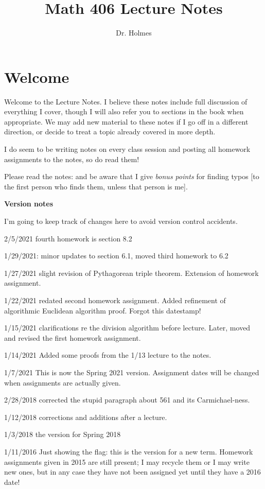 \documentclass[12pt]{article}
\title{Math 406 Lecture Notes}
\author{Dr. Holmes}
\date{2/5/2021:  fourth homework is section 8.2.

1/29/2021:  minor updates to section 6.1, moved third homework to 6.2\\
1/27/2021:  slight revision of Pythagorean triple theorem.  Extension of homework assignment.\\
1/22/2021:  redated second homework assigment (forgot to put this datestamp on)\\
1/15/2021:  clarifications before lecture;  (later) moved and revised the first homework assignment.\\
1/14/2021:  added some proofs given in the 1/13 lecture to the notes.\\
1/7/2021:  initial version of the Notes for Spring 2021}
\begin{document}
\maketitle

\section{Welcome}

Welcome to the Lecture Notes.  I believe these notes include full discussion of everything I cover, though I will also refer you to sections in the book when appropriate.  We may add new material to these notes if I go off in a different direction, or decide to treat a topic already covered in more depth.

I do seem to be writing notes on every class session and posting all homework assignments to the notes, so do read them!

Please read the notes:  and be aware that I give {\em bonus points} for finding typos [to the first person who finds them, unless that person is me].

{\bf Version notes}

I'm going to keep track of changes here to avoid version control accidents.

2/5/2021 fourth homework is section 8.2

1/29/2021:  minor updates to section 6.1, moved third homework to 6.2

1/27/2021   slight revision of Pythagorean triple theorem.  Extension of homework assignment.

1/22/2021  redated second homework assignment.  Added refinement of algorithmic Euclidean algorithm proof.  Forgot this datestamp!

1/15/2021 clarifications re the division algorithm before lecture.  Later, moved and revised the first homework assignment.

1/14/2021  Added some proofs from the 1/13 lecture to the notes.

1/7/2021 This is now the Spring 2021 version.  Assignment dates will be changed when assignments are actually given.

2/28/2018 corrected the stupid paragraph about 561 and its Carmichael-ness.

1/12/2018 corrections and additions after a lecture.

1/3/2018 the version for Spring 2018

1/11/2016  Just showing the flag:  this is the version for a new term.  Homework assignments given in 2015 are still present; I may recycle them or I may write new ones, but in any case they have not been assigned yet until they have a 2016 date!
\end{document}
